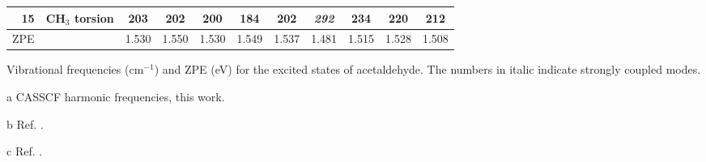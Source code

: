 \begin{center}
\begin{threeparttable}
\begin{tabular}{rcccccccccc}
15&CH$_3$ torsion&      203 &  202 &      200 &  184 &  202 & {\it 292}&  234 &  220 &  212 \\
\hline                                                                                     
ZPE  &           &    1.530 &1.550 &    1.530 &1.549 &1.537 &    1.481 &1.515 &1.528 & 1.508 \\
\hline
\end{tabular}
\caption{\footnotesize Vibrational frequencies (cm$^{-1}$) and ZPE (eV)
for the excited states of acetaldehyde. The numbers in italic indicate strongly coupled modes.
}\label{tbl:vibra_exc_aceta}
\begin{tablenotes}
\footnotesize
\item[a] CASSCF harmonic frequencies, this work.
\item[b] Ref. .
\item[c] Ref. .
\end{tablenotes}
\end{threeparttable}
\end{center}
